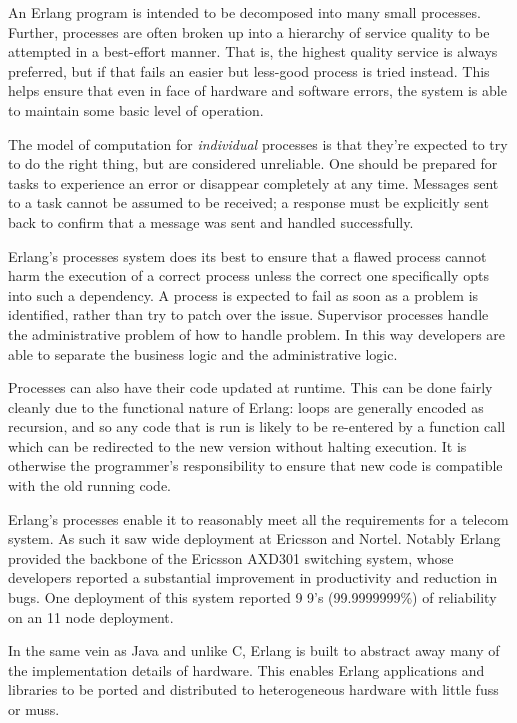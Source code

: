 \documentclass[10pt,a4paper,twocolumn]{article}
\begin{document}
An Erlang program is intended to be decomposed into many small processes. Further,
processes are often broken up into a hierarchy of service quality to be attempted in a
best-effort manner. That is, the highest quality service is always preferred, but if
that fails an easier but less-good process is tried instead. This helps ensure
that even in face of hardware and software errors, the system is able to
maintain some basic level of operation.

The model of computation for \emph{individual} processes is that they're
expected to try to do the right thing, but are considered unreliable. One should
be prepared for tasks to experience an error or disappear completely at any
time. Messages sent to a task cannot be assumed to be received; a response must
be explicitly sent back to confirm that a message was sent and handled
successfully.

Erlang's processes system does its best to ensure that a flawed process cannot
harm the execution of a correct process unless the correct one specifically opts
into such a dependency. A process is expected to fail as soon as a problem is
identified, rather than try to patch over the issue. Supervisor processes handle
the administrative problem of how to handle problem. In this way developers are
able to separate the business logic and the administrative logic.
\cite{erlangADX}

Processes can also have their code updated at runtime. This can be done fairly
cleanly due to the functional nature of Erlang: loops are generally encoded as
recursion, and so any code that is run is likely to be re-entered by a function
call which can be redirected to the new version without halting execution. It is
otherwise the programmer's responsibility to ensure that new code is compatible
with the old running code. \cite{erlangthesis}

Erlang's processes enable it to reasonably meet all the requirements for a
telecom system. As such it saw wide deployment at Ericsson and Nortel. Notably
Erlang provided the backbone of the Ericsson AXD301 switching system, whose
developers reported a substantial improvement in productivity and reduction in
bugs. \cite{erlangADX} One deployment of this system reported 9 9's
(99.9999999\%) of reliability on an 11 node deployment. \cite{erlangthesis}

In the same vein as Java and unlike C, Erlang is built to abstract away many of
the implementation details of hardware. This enables Erlang applications and
libraries to be ported and distributed to heterogeneous hardware with little
fuss or muss. \cite{erlangthesis}
\end{document}
